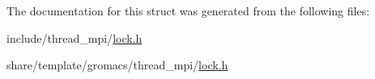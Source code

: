 \-The documentation for this struct was generated from the following files\-:\begin{DoxyCompactItemize}
\item 
include/thread\-\_\-mpi/\hyperlink{include_2thread__mpi_2lock_8h}{lock.\-h}\item 
share/template/gromacs/thread\-\_\-mpi/\hyperlink{share_2template_2gromacs_2thread__mpi_2lock_8h}{lock.\-h}\end{DoxyCompactItemize}
